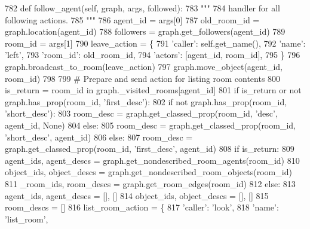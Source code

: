 \begin{DoxyCode}
782     \textcolor{keyword}{def }follow\_agent(self, graph, args, followed):
783         \textcolor{stringliteral}{"""}
784 \textcolor{stringliteral}{        handler for all following actions.}
785 \textcolor{stringliteral}{        """}
786         agent\_id = args[0]
787         old\_room\_id = graph.location(agent\_id)
788         followers = graph.get\_followers(agent\_id)
789         room\_id = args[1]
790         leave\_action = \{
791             \textcolor{stringliteral}{'caller'}: self.get\_name(),
792             \textcolor{stringliteral}{'name'}: \textcolor{stringliteral}{'left'},
793             \textcolor{stringliteral}{'room\_id'}: old\_room\_id,
794             \textcolor{stringliteral}{'actors'}: [agent\_id, room\_id],
795         \}
796         graph.broadcast\_to\_room(leave\_action)
797         graph.move\_object(agent\_id, room\_id)
798 
799         \textcolor{comment}{# Prepare and send action for listing room contents}
800         is\_return = room\_id \textcolor{keywordflow}{in} graph.\_visited\_rooms[agent\_id]
801         \textcolor{keywordflow}{if} is\_return \textcolor{keywordflow}{or} \textcolor{keywordflow}{not} graph.has\_prop(room\_id, \textcolor{stringliteral}{'first\_desc'}):
802             \textcolor{keywordflow}{if} \textcolor{keywordflow}{not} graph.has\_prop(room\_id, \textcolor{stringliteral}{'short\_desc'}):
803                 room\_desc = graph.get\_classed\_prop(room\_id, \textcolor{stringliteral}{'desc'}, agent\_id, \textcolor{keywordtype}{None})
804             \textcolor{keywordflow}{else}:
805                 room\_desc = graph.get\_classed\_prop(room\_id, \textcolor{stringliteral}{'short\_desc'}, agent\_id)
806         \textcolor{keywordflow}{else}:
807             room\_desc = graph.get\_classed\_prop(room\_id, \textcolor{stringliteral}{'first\_desc'}, agent\_id)
808         \textcolor{keywordflow}{if} is\_return:
809             agent\_ids, agent\_descs = graph.get\_nondescribed\_room\_agents(room\_id)
810             object\_ids, object\_descs = graph.get\_nondescribed\_room\_objects(room\_id)
811             \_room\_ids, room\_descs = graph.get\_room\_edges(room\_id)
812         \textcolor{keywordflow}{else}:
813             agent\_ids, agent\_descs = [], []
814             object\_ids, object\_descs = [], []
815             room\_descs = []
816         list\_room\_action = \{
817             \textcolor{stringliteral}{'caller'}: \textcolor{stringliteral}{'look'},
818             \textcolor{stringliteral}{'name'}: \textcolor{stringliteral}{'list\_room'},

\end{DoxyCode}
